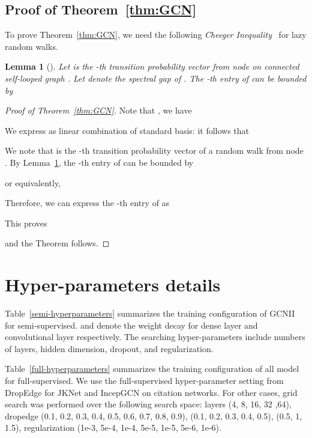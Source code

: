 \documentclass{article}
\newtheorem{lemma}{Lemma}
\begin{document}
 \subsection{Proof of Theorem~\ref{thm:GCN}}
 To prove Theorem~\ref{thm:GCN}, we need the following {\em Cheeger Inequality}~\cite{chung2007four} for
lazy random walks. 

      \begin{lemma}[\cite{chung2007four}]
        \label{lem:cheeger}
        Let  is the -th transition probability vector from
      node  on connected self-looped graph . Let  denote the
spectral gap of . 
        The -th entry of
       can be bounded by
      
        \end{lemma}


\begin{proof}[Proof of Theorem~\ref{thm:GCN}]
  Note that , we have
  
 We express  as linear combination of standard basis:
  it follows that
    

  We note that   is the -th transition
      probability vector of a random walk from
     node . By Lemma~\ref{lem:cheeger}, the -th entry of
       can be bounded by
      
or equivalently, 

Therefore, we can express the -th entry of   as  

    This proves
    
and the Theorem follows.
    \end{proof}

\section{Hyper-parameters details}
\label{appendix-hyperparameters}



Table~\ref{semi-hyperparameters} summarizes the training configuration of GCNII for semi-supervised.  and  denote the weight decay for dense layer and convolutional layer respectively. The searching hyper-parameters include numbers of layers, hidden dimension, dropout,  and  regularization.

  
Table~\ref{full-hyperparameters} summarizes the training configuration of all model for full-supervised. We use the full-supervised hyper-parameter setting from DropEdge for JKNet and IncepGCN on citation networks. For other cases, grid search was performed over the following search space: layers (4, 8, 16, 32 ,64), dropedge (0.1, 0.2, 0.3, 0.4, 0.5, 0.6, 0.7, 0.8, 0.9),  (0.1, 0.2, 0.3, 0.4, 0.5),  (0.5, 1, 1.5),  regularization (1e-3, 5e-4, 1e-4, 5e-5, 1e-5, 5e-6, 1e-6). 
\end{document}
